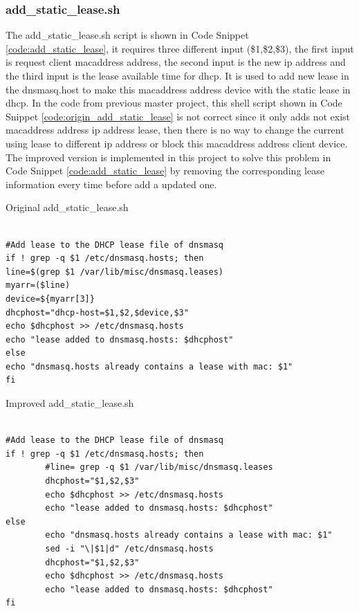 \subsubsection{add\_static\_lease.sh}
\par The add\_static\_lease.sh script is shown in Code Snippet \ref{code:add_static_lease}, it requires three different input (\$1,\$2,\$3), the first input is request client \gls{macaddress} address, the second input is the new \gls{ip} address and the third input is the lease available time for \gls{dhcp}. It is used to add new lease in the dnsmasq.host to make this \gls{macaddress} address device with the static lease in \gls{dhcp}. In the code from previous master project, this shell script shown in Code Snippet \ref{code:origin_add_static_lease} is not correct since it only adds not exist \gls{macaddress} address \gls{ip} address lease, then there is no way to change the current using lease to different \gls{ip} address or block this \gls{macaddress} address client device. The improved version is implemented in this project to solve this problem in Code Snippet \ref{code:add_static_lease} by removing the corresponding lease information every time before add a updated one.

\begin{algorithm}[h]
  \caption{Original add\_static\_lease.sh}
  \label{code:origin_add_static_lease}
  \begin{verbatim}
  
#Add lease to the DHCP lease file of dnsmasq
if ! grep -q $1 /etc/dnsmasq.hosts; then
line=$(grep $1 /var/lib/misc/dnsmasq.leases)
myarr=($line)
device=${myarr[3]}
dhcphost="dhcp-host=$1,$2,$device,$3"
echo $dhcphost >> /etc/dnsmasq.hosts
echo "lease added to dnsmasq.hosts: $dhcphost"
else
echo "dnsmasq.hosts already contains a lease with mac: $1"
fi
 \end{verbatim}
\end{algorithm}

\begin{algorithm}[h]
  \caption{Improved add\_static\_lease.sh}
  \label{code:add_static_lease}
  \begin{verbatim}
  
#Add lease to the DHCP lease file of dnsmasq
if ! grep -q $1 /etc/dnsmasq.hosts; then
        #line= grep -q $1 /var/lib/misc/dnsmasq.leases
        dhcphost="$1,$2,$3"
        echo $dhcphost >> /etc/dnsmasq.hosts
        echo "lease added to dnsmasq.hosts: $dhcphost"
else
        echo "dnsmasq.hosts already contains a lease with mac: $1"
        sed -i "\|$1|d" /etc/dnsmasq.hosts
        dhcphost="$1,$2,$3"
        echo $dhcphost >> /etc/dnsmasq.hosts
        echo "lease added to dnsmasq.hosts: $dhcphost"
fi
 \end{verbatim}
\end{algorithm}

